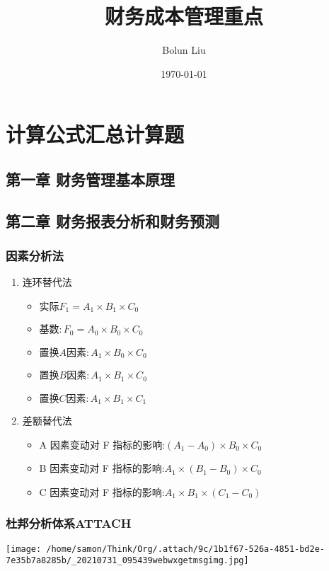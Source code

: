 \documentclass[12pt,a4paper]{article}
\author{Bolun Liu}
\date{\today}
\title{财务成本管理重点}
\begin{document}
\maketitle
\tableofcontents

\section{计算公式汇总\hfill{}\textsc{计算题}}
\label{sec:orgf401b72}
\subsection{第一章 财务管理基本原理}
\label{sec:orgade993a}
\subsection{第二章 财务报表分析和财务预测}
\label{sec:orgd61bd7f}
\subsubsection{因素分析法}
\label{sec:org0fa71b3}
\begin{enumerate}
\item 连环替代法
\label{sec:orgb551e98}
\begin{itemize}
\item \(实际 F_1=A_1\times B_1\times C_0\)
\item \(基数:F_0=A_0\times B_0\times C_0\)
\item \(置换 A 因素:A_1 \times B_0 \times C_0\)
\item \(置换 B 因素:A_{1}\times B_{1}\times C_0\)
\item \(置换 C 因素:A_1\times B_1 \times C_1\)
\end{itemize}
\item 差额替代法
\label{sec:org72a6761}
\begin{itemize}
\item A 因素变动对 F 指标的影响:\((A_{1}-A_{0})\times B_{0}\times C_{0}\)
\item B 因素变动对 F 指标的影响:\(A_{1}\times (B_{1}-B_{0}) \times C_{0}\)
\item C 因素变动对 F 指标的影响:\(A_{1}\times B_{1} \times (C_{1}-C_{0})\)
\end{itemize}
\end{enumerate}
\subsubsection{杜邦分析体系\hfill{}\textsc{ATTACH}}
\label{sec:org2eef257}
\begin{center}
\texttt{[image: /home/samon/Think/Org/.attach/9c/1b1f67-526a-4851-bd2e-7e35b7a8285b/\_20210731\_095439webwxgetmsgimg.jpg]}
\end{center}
\end{document}
